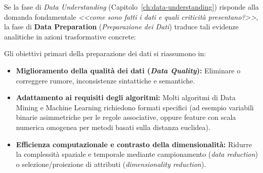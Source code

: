 Se la fase di \textit{Data Understanding} (Capitolo~\ref{ch:data-understanding}) risponde alla domanda fondamentale \textit{<<come sono fatti i dati e quali criticità presentano?>>}, la fase di \textbf{Data Preparation} (\textit{Preparazione dei Dati}) traduce tali evidenze analitiche in azioni trasformative concrete:
\begin{center}
\end{center}

Gli obiettivi primari della preparazione dei dati si riassumono in:
\begin{itemize}
    \item \textbf{Miglioramento della qualità dei dati (\textit{Data Quality}):} Eliminare o correggere rumore, inconsistenze sintattiche e semantiche.
    \item \textbf{Adattamento ai requisiti degli algoritmi:} Molti algoritmi di Data Mining e Machine Learning richiedono formati specifici (ad esempio variabili binarie asimmetriche per le regole associative, oppure feature con scala numerica omogenea per metodi basati sulla distanza euclidea).
    \item \textbf{Efficienza computazionale e contrasto della dimensionalità:} Ridurre la complessità spaziale e temporale mediante campionamento (\textit{data reduction}) o selezione/proiezione di attributi (\textit{dimensionality reduction}).
\end{itemize}

